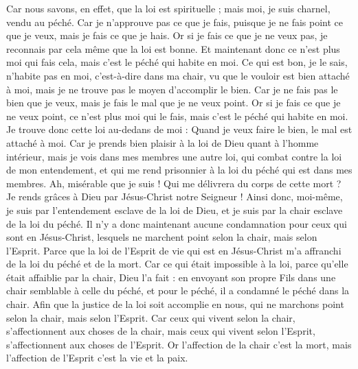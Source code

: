 \begin{multicols}{2}
Car nous savons, en effet, que la loi est spirituelle ; mais moi, je suis charnel, vendu au péché.
\TextTitle{[la connaissance du bien incapable de délivrer l'homme du péché}
Car je n'approuve pas ce que je fais, puisque je ne fais point ce que je veux, mais je fais ce que je hais.
Or si je fais ce que je ne veux pas, je reconnais par cela même que la loi est bonne.
Et maintenant donc ce n'est plus moi qui fais cela, mais c'est le péché qui habite en moi.
Ce qui est bon, je le sais, n’habite pas en moi, c’est-à-dire dans ma chair, vu que le vouloir est bien attaché à moi, mais je ne trouve pas le moyen d’accomplir le bien.
Car je ne fais pas le bien que je veux, mais je fais le mal que je ne veux point.
Or si je fais ce que je ne veux point, ce n'est plus moi qui le fais, mais c'est le péché qui habite en moi.
Je trouve donc cette loi au-dedans de moi : Quand je veux faire le bien, le mal est attaché à moi.
Car je prends bien plaisir à la loi de Dieu quant à l'homme intérieur,
mais je vois dans mes membres une autre loi, qui combat contre la loi de mon entendement, et qui me rend prisonnier à la loi du péché qui est dans mes membres.
Ah, misérable que je suis ! Qui me délivrera du corps de cette mort ?
Je rends grâces à Dieu par Jésus-Christ notre Seigneur ! Ainsi donc, moi-même, je suis par l’entendement esclave de la loi de Dieu, et je suis par la chair esclave de la loi du péché.
\VerseOne{}Il n'y a donc maintenant aucune condamnation pour ceux qui sont en Jésus-Christ, lesquels ne marchent point selon la chair, mais selon l'Esprit.
Parce que la loi de l'Esprit de vie qui est en Jésus-Christ m'a affranchi de la loi du péché et de la mort.
Car ce qui était impossible à la loi, parce qu'elle était affaiblie par la chair, Dieu l'a fait : en envoyant son propre Fils dans une chair semblable à celle du péché, et pour le péché, il a condamné le péché dans la chair.
Afin que la justice de la loi soit accomplie en nous, qui ne marchons point selon la chair, mais selon l'Esprit.
Car ceux qui vivent selon la chair, s’affectionnent aux choses de la chair, mais ceux qui vivent selon l'Esprit, s’affectionnent aux choses de l'Esprit.
Or l'affection de la chair c’est la mort, mais l'affection de l'Esprit c’est la vie et la paix.

\end{multicols}
